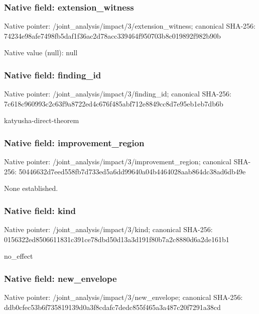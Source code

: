 \documentclass[10pt,a4paper]{article}
\begin{document}
\subsubsection{Native field: extension\_\allowbreak{}witness}
Native pointer: /joint\_\allowbreak{}analysis/impact/3/extension\_\allowbreak{}witness; canonical SHA-256: 74234e98afe7498fb5daf1f36ac2d78acc339464f950703b8c019892f982b90b

Native value (null): null

\subsubsection{Native field: finding\_\allowbreak{}id}
Native pointer: /joint\_\allowbreak{}analysis/impact/3/finding\_\allowbreak{}id; canonical SHA-256: 7c618c960993c2c63f9a8722ed4c676f485abf712e8849cc8d7e95eb1eb7db6b

\begingroup\raggedright\sloppy katyusha-direct-theorem\par\endgroup

\subsubsection{Native field: improvement\_\allowbreak{}region}
Native pointer: /joint\_\allowbreak{}analysis/impact/3/improvement\_\allowbreak{}region; canonical SHA-256: 50446632d7eed558fb7d733ed5a6dd99640a04b4464028aab864dc38ad6db49e

\begingroup\raggedright\sloppy None established.\par\endgroup

\subsubsection{Native field: kind}
Native pointer: /joint\_\allowbreak{}analysis/impact/3/kind; canonical SHA-256: 0156322ed8506611831c391ce78dbd50d13a3d191f80b7a2c8880d6a2de161b1

\begingroup\raggedright\sloppy no\_\allowbreak{}effect\par\endgroup

\subsubsection{Native field: new\_\allowbreak{}envelope}
Native pointer: /joint\_\allowbreak{}analysis/impact/3/new\_\allowbreak{}envelope; canonical SHA-256: ddb0cfec53b6f735819139d0a3f8cdafc7dedc855f465a3a487c20f7291a38cd
\end{document}
